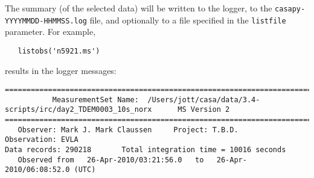The summary (of the selected data) will be written to the logger, to
the {\tt casapy-YYYYMMDD-HHMMSS.log} file, and optionally to a file
specified in the {\tt listfile} parameter.  For example, \small
\begin{verbatim}
   listobs('n5921.ms')
\end{verbatim}
\normalsize
results in the logger messages:
\small
\begin{verbatim}
================================================================================
           MeasurementSet Name:  /Users/jott/casa/data/3.4-scripts/irc/day2_TDEM0003_10s_norx      MS Version 2
================================================================================
   Observer: Mark J. Mark Claussen     Project: T.B.D.  
Observation: EVLA
Data records: 290218       Total integration time = 10016 seconds
   Observed from   26-Apr-2010/03:21:56.0   to   26-Apr-2010/06:08:52.0 (UTC)
   

\end{verbatim}
